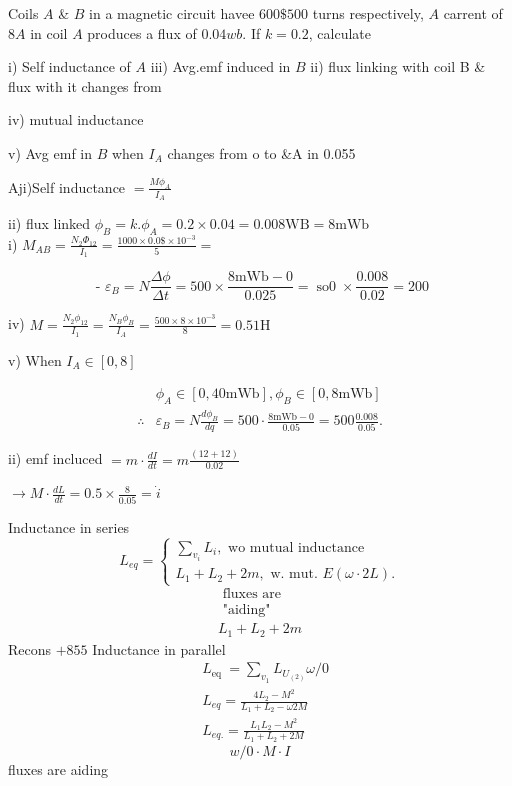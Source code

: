\documentclass[12pt, a4paper]{article}
\begin{document}
Coils $A$ \& $B$ in a magnetic circuit havee $600 \$ 500$ turns respectively, $A$ carrent of $8 A$ in coil $A$ produces a flux of $0.04 w b$. If $k=0.2$, calculate

	i) Self inductance of $A$ iii) Avg.emf induced in $B$ ii) flux linking with coil B \& flux with it changes from

	iv) mutual inductance

	v) Avg emf in $B$ when $I_{A}$ changes from o to \&A in 0.055

	Aji)Self inductance $=\frac{M \phi_{A}}{I_{A}}$

	ii) flux linked $\phi_{B}=k . \phi_{A}=0.2 \times 0.04=0.008 \mathrm{WB}=8 \mathrm{mWb}$\\
	i) $M_{A B}=\frac{N_{2} \Phi_{12}}{I_{1}}=\frac{1000 \times 0.0 \$ \times 10^{-3}}{5}=$

	$$
		\text { - } \varepsilon_{B}=N \frac{\Delta \phi}{\Delta t}=500 \times \frac{8 \mathrm{mWb}-0}{0.025}=\operatorname{so0} \times \frac{0.008}{0.02}=200
	$$

	iv) $M=\frac{N_{2} \phi_{12}}{I_{1}}=\frac{N_{B} \phi_{B}}{I_{A}}=\frac{500 \times 8 \times 10^{-3}}{8}=0.51 \mathrm{H}$

	v) When $I_{A} \in[0,8]$


	\begin{align*}
		           & \phi_{A} \in[0,40 \mathrm{mWb}], \phi_{B} \in[0,8 \mathrm{mWb}]                                           \\
		\therefore & \varepsilon_{B}=N \frac{d \phi_{B}}{d q}=500 \cdot \frac{8 \mathrm{mWb}-0}{0.05}=500 \frac{0.008}{0.05} .
	\end{align*}


	ii) emf incluced $=m \cdot \frac{d I}{d t}=m \frac{(12+12)}{0.02}$

$\rightarrow M \cdot \frac{d L}{d t}=0.5 \times \frac{8}{0.05}=\dot{i}$

	Inductance in series
	$$
		L_{e q}=\left\{\begin{array}{l}
			\sum_{v_i} L_i, \text { wo mutual inductance } \\
			L_1+L_2+2 m, \text { w. mut. } E(\omega \cdot 2 L) .
		\end{array}\right.
	$$
	$$
		\begin{gathered}
			\text { fluxes are } \\
			\text { "aiding" } \\
			L_1+L_2+2 m
		\end{gathered}
	$$
	Recons
$+855$
	Inductance in parallel
	$$
		\begin{aligned}
			 & L_{\text {eq }}=\sum_{v_1} L_{U_{(2)}} \omega / 0 \\
			 & L_{e q}=\frac{4 L_2-M^2}{L_1+L_2-\omega 2 M}      \\
			 & L_{e q .}=\frac{L_1 L_2-M^2}{L_1+L_2+2 M}
		\end{aligned}
	$$
	$$
		w / 0 \cdot M \cdot I
	$$
	fluxes are aiding
\end{document}
